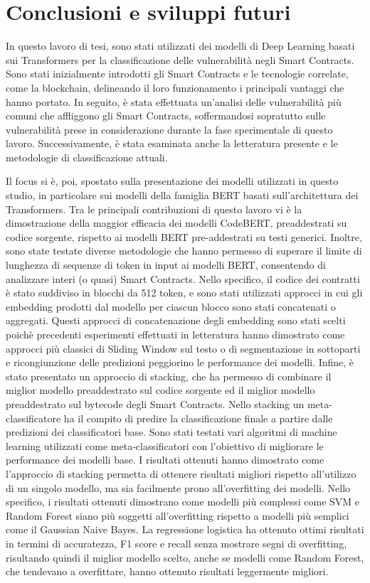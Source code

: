 \documentclass[../../Thesis.tex]{subfiles}
\begin{document}
\chapter{Conclusioni e sviluppi futuri}
\label{cap:conclusioni}
In questo lavoro di tesi, sono stati utilizzati dei modelli di Deep Learning basati sui Transformers per la classificazione delle vulnerabilit\`a negli Smart Contracts. Sono stati inizialmente introdotti gli Smart Contracts e le tecnologie correlate, come la blockchain, delineando il loro funzionamento i principali vantaggi che hanno portato. In seguito, \`e stata effettuata un'analisi delle vulnerabilit\`a pi\`u comuni che affliggono gli Smart Contracts, soffermandosi sopratutto sulle vulnerabilit\`a prese in considerazione durante la fase sperimentale di questo lavoro. Successivamente, \`e stata esaminata anche la letteratura presente e le metodologie di classificazione attuali. 

Il focus si \`e, poi, spostato sulla presentazione dei modelli utilizzati in questo studio, in particolare sui modelli della famiglia BERT basati sull'architettura dei Transformers. Tra le principali contribuzioni di questo lavoro vi \`e la dimostrazione della maggior efficacia dei modelli CodeBERT, preaddestrati su codice sorgente, rispetto ai modelli BERT pre-addestrati su testi generici. 
Inoltre, sono state testate diverse metodologie che hanno permesso di superare il limite di lunghezza di sequenze di token in input ai modelli BERT, consentendo di analizzare interi (o quasi) Smart Contracts. Nello specifico, il codice dei contratti \`e stato suddiviso in blocchi da 512 token, e sono stati utilizzati approcci in cui gli embedding prodotti dal modello per ciascun blocco sono stati concatenati o aggregati. Questi approcci di concatenazione degli embedding sono stati scelti poich\`e precedenti esperimenti effettuati in letteratura hanno dimostrato come approcci pi\`u classici di Sliding Window sul testo o di segmentazione in sottoparti e ricongiunzione delle predizioni peggiorino le performance dei modelli.
Infine, \`e stato presentato un approccio di stacking, che ha permesso di combinare il miglior modello preaddestrato sul codice sorgente ed il miglior modello preaddestrato sul bytecode degli Smart Contracts. Nello stacking un meta-classificatore ha il compito di predire la classificazione finale a partire dalle predizioni dei classificatori base. Sono stati testati vari algoritmi di machine learning utilizzati come meta-classificatori con l'obiettivo di migliorare le performance dei modelli base. I risultati ottenuti hanno dimostrato come l'approccio di stacking permetta di ottenere risultati migliori rispetto all'utilizzo di un singolo modello, ma sia facilmente prono all'overfitting dei modelli. Nello specifico, i risultati ottenuti dimostrano come modelli pi\`u complessi come SVM e Random Forest siano pi\`u soggetti all'overfitting rispetto a modelli pi\`u semplici come il Gaussian Naive Bayes. La regressione logistica ha ottenuto ottimi risultati in termini di accuratezza, F1 score e recall senza mostrare segni di overfitting, risultando quindi il miglior modello scelto, anche se modelli come Random Forest, che tendevano a overfittare, hanno ottenuto risultati leggermente migliori.
\end{document}
